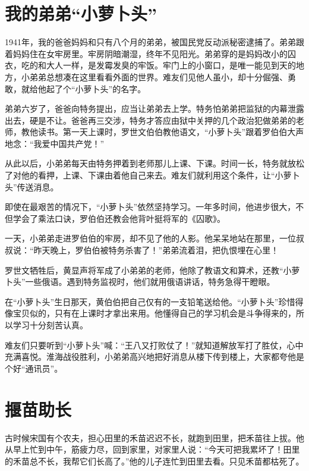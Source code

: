\documentclass[12pt,UTF-8,openany]{ctexbook}
\begin{document}
\chapter{我的弟弟“小萝卜头”}

\begin{large}
    
    1941年，我的爸爸妈妈和只有八个月的弟弟，被国民党反动派秘密逮捕了。弟弟跟着妈妈住在女牢房里。牢房阴暗潮湿，终年不见阳光。弟弟穿的是妈妈改小的囚衣，吃的和大人一样，是发霉发臭的牢饭。牢门上的小窗口，是唯一能见到天的地方，小弟弟总想凑在这里看看外面的世界。难友们见他人虽小，却十分倔强、勇敢，就给他起了个“小萝卜头”的名字。
    
    弟弟六岁了，爸爸向特务提出，应当让弟弟去上学。特务怕弟弟把监狱的内幕泄露出去，硬是不让。爸爸再三交涉，特务才答应由狱中关押的几个政治犯做弟弟的老师，教他读书。第一天上课时，罗世文伯伯教他语文，“小萝卜头”跟着罗伯伯大声地念：“我爱中国共产党！”
    
    从此以后，小弟弟每天由特务押着到老师那儿上课、下课。时间一长，特务就放松了对他的看押，上课、下课由着他自己来去。难友们就利用这个条件，让“小萝卜头”传送消息。
    
    即使在最艰苦的情况下，“小萝卜头”依然坚持学习。一年多时间，他进步很大，不但学会了乘法口诀，罗伯伯还教会他背叶挺将军的《囚歌》。
    
    一天，小弟弟走进罗伯伯的牢房，却不见了他的人影。他呆呆地站在那里，一位叔叔说：“昨天晚上，罗伯伯被特务杀害了！”弟弟流着泪，把仇恨埋在心里！
    
    罗世文牺牲后，黄显声将军成了小弟弟的老师，他除了教语文和算术，还教“小萝卜头”一些俄语。遇到特务监视时，他们就用俄语讲话，特务急得干瞪眼。
    
    在“小萝卜头”生日那天，黄伯伯把自己仅有的一支铅笔送给他。“小萝卜头”珍惜得像宝贝似的，只有在上课时才拿出来用。他懂得自己的学习机会是斗争得来的，所以学习十分刻苦认真。
    
    难友们只要听到“小萝卜头”喊：“王八又打败仗了！”就知道解放军打了胜仗，心中充满喜悦。淮海战役胜利，小弟弟高兴地把好消息从楼下传到楼上，大家都夸他是个好“通讯员”。
    
\end{large}



\chapter{揠苗助长}

\begin{large}
    
    古时候宋国有个农夫，担心田里的禾苗迟迟不长，就跑到田里，把禾苗往上拔。他从早上忙到中午，筋疲力尽，回到家里，对家里人说：“今天可把我累坏了！田里的禾苗总不长，我帮它们长高了。”他的儿子连忙到田里去看。只见禾苗都枯死了。
    
\end{large}
\end{document}
